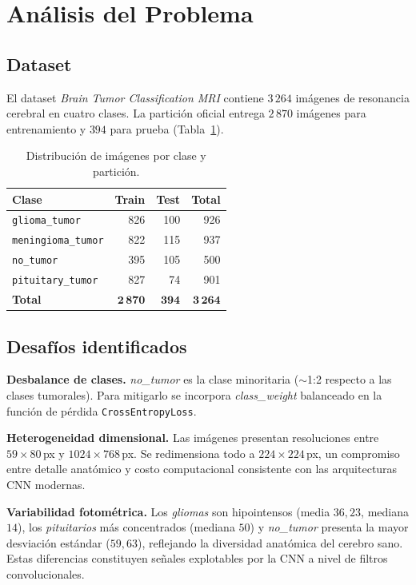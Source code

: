 \documentclass[conference]{IEEEtran}
\begin{document}
\section{Análisis del Problema}

\subsection{Dataset}
El dataset \textit{Brain Tumor Classification MRI}
contiene $3\,264$ imágenes de resonancia cerebral en cuatro
clases. La partición oficial entrega $2\,870$ imágenes para
entrenamiento y $394$ para prueba
(Tabla~\ref{tab:art-dist}).

\begin{table}[!t]
\centering
\caption{Distribución de imágenes por clase y partición.}
\label{tab:art-dist}
\footnotesize
\begin{tabular}{lrrr}
\toprule
\textbf{Clase} & \textbf{Train} & \textbf{Test} & \textbf{Total} \\
\midrule
\texttt{glioma\_tumor}     & 826 & 100 & 926 \\
\texttt{meningioma\_tumor} & 822 & 115 & 937 \\
\texttt{no\_tumor}         & 395 & 105 & 500 \\
\texttt{pituitary\_tumor}  & 827 &  74 & 901 \\
\midrule
\textbf{Total}             & $\mathbf{2\,870}$ & $\mathbf{394}$ & $\mathbf{3\,264}$ \\
\bottomrule
\end{tabular}
\end{table}

\subsection{Desafíos identificados}

\textbf{Desbalance de clases.} \textit{no\_tumor} es la clase
minoritaria ($\sim$1:2 respecto a las clases tumorales). Para
mitigarlo se incorpora \textit{class\_weight} balanceado en la
función de pérdida \texttt{CrossEntropyLoss}.

\textbf{Heterogeneidad dimensional.} Las imágenes presentan
resoluciones entre $59{\times}80$\,px y $1024{\times}768$\,px.
Se redimensiona todo a $224{\times}224$\,px, un compromiso
entre detalle anatómico y costo computacional consistente con
las arquitecturas CNN modernas.

\textbf{Variabilidad fotométrica.} Los \textit{gliomas} son
hipointensos (media $36{,}23$, mediana $14$), los
\textit{pituitarios} más concentrados (mediana $50$) y
\textit{no\_tumor} presenta la mayor desviación estándar
($59{,}63$), reflejando la diversidad anatómica del cerebro
sano. Estas diferencias constituyen señales explotables por la
CNN a nivel de filtros convolucionales.
\end{document}
